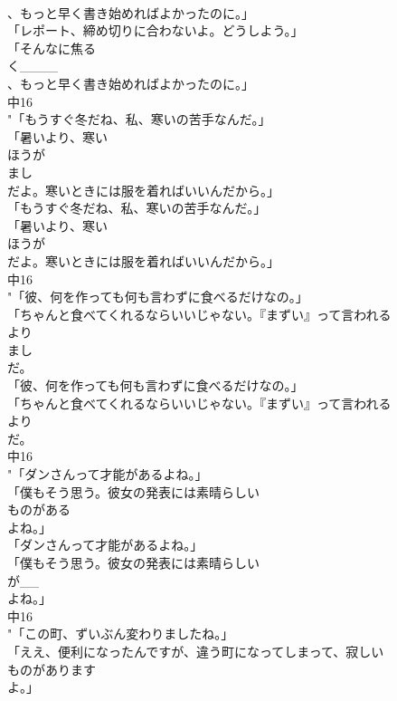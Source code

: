 \documentclass[8pt]{extreport}
\begin{document}
\begin{CJK}{UTF8}{min}
\\	、もっと早く書き始めればよかったのに。」
\\	「レポート、締め切りに合わないよ。どうしよう。」
\\	「そんなに焦る
\\	く____
\\	、もっと早く書き始めればよかったのに。」
\\	中16
\\	"「もうすぐ冬だね、私、寒いの苦手なんだ。」
\\	「暑いより、寒い
\\	ほうが
\\	まし
\\	だよ。寒いときには服を着ればいいんだから。」
\\	「もうすぐ冬だね、私、寒いの苦手なんだ。」
\\	「暑いより、寒い
\\	ほうが
\\	だよ。寒いときには服を着ればいいんだから。」
\\	中16
\\	"「彼、何を作っても何も言わずに食べるだけなの。」
\\	「ちゃんと食べてくれるならいいじゃない。『まずい』って言われる
\\	より
\\	まし
\\	だ。
\\	「彼、何を作っても何も言わずに食べるだけなの。」
\\	「ちゃんと食べてくれるならいいじゃない。『まずい』って言われる
\\	より
\\	だ。
\\	中16
\\	"「ダンさんって才能があるよね。」
\\	「僕もそう思う。彼女の発表には素晴らしい
\\	ものがある
\\	よね。」
\\	「ダンさんって才能があるよね。」
\\	「僕もそう思う。彼女の発表には素晴らしい
\\	が__
\\	よね。」
\\	中16
\\	"「この町、ずいぶん変わりましたね。」
\\	「ええ、便利になったんですが、違う町になってしまって、寂しい
\\	ものがあります
\\	よ。」

\end{CJK}
\end{document}
